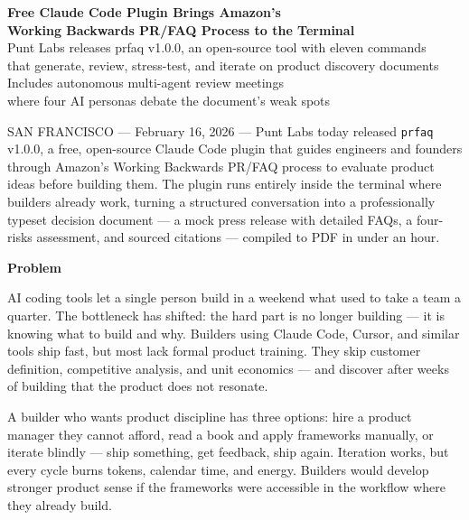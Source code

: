 \documentclass[11pt,letterpaper]{article}
\newcommand{\prsection}[1]{%
  \vspace{1em}%
  {\large\bfseries\color{SectionBlue}#1}%
  \vspace{0.3em}\par%
}
\begin{document}
\begin{center}
  {\LARGE\bfseries\color{SectionBlue} Free Claude Code Plugin Brings Amazon's\\Working Backwards PR/FAQ Process to the Terminal} \\[0.8em]
  {\large\color{AccentGray} Punt Labs releases prfaq v1.0.0, an open-source tool with eleven commands\\that generate, review, stress-test, and iterate on product discovery documents} \\[0.3em]
  {\large\color{AccentGray} Includes autonomous multi-agent review meetings\\where four AI personas debate the document's weak spots}
\end{center}

\vspace{0.5em}

SAN FRANCISCO --- February 16, 2026 --- Punt Labs today released \texttt{prfaq} v1.0.0, a free, open-source Claude Code plugin that guides engineers and founders through Amazon's Working Backwards PR/FAQ process to evaluate product ideas before building them. The plugin runs entirely inside the terminal where builders already work, turning a structured conversation into a professionally typeset decision document --- a mock press release with detailed FAQs, a four-risks assessment, and sourced citations --- compiled to PDF in under an hour.

\prsection{Problem}

AI coding tools let a single person build in a weekend what used to take a team a quarter. The bottleneck has shifted: the hard part is no longer building --- it is knowing what to build and why. Builders using Claude Code, Cursor, and similar tools ship fast, but most lack formal product training. They skip customer definition, competitive analysis, and unit economics --- and discover after weeks of building that the product does not resonate.

A builder who wants product discipline has three options: hire a product manager they cannot afford, read a book and apply frameworks manually, or iterate blindly --- ship something, get feedback, ship again. Iteration works, but every cycle burns tokens, calendar time, and energy. Builders would develop stronger product sense if the frameworks were accessible in the workflow where they already build.
\end{document}
